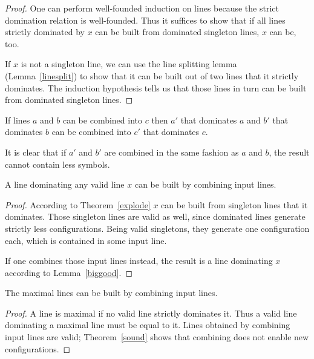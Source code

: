 \documentclass[english, 12pt, a4paper, sci, a-1b, online]{aaltothesis}
\begin{document}
\begin{proof}
One can perform well-founded induction on lines because the strict domination relation is well-founded. Thus it suffices to show that if all lines strictly dominated by $x$ can be built from dominated singleton lines, $x$ can be, too.

If $x$ is not a singleton line, we can use the line splitting lemma (Lemma~\ref{linesplit}) to show that it can be built out of two lines that it strictly dominates. The induction hypothesis tells us that those lines in turn can be built from dominated singleton lines.
\end{proof}

\begin{lemma}\label{biggood}
If lines $a$ and $b$ can be combined into $c$ then $a'$ that dominates $a$ and $b'$ that dominates $b$ can be combined into $c'$ that dominates $c$.
\end{lemma}

It is clear that if $a'$ and $b'$ are combined in the same fashion as $a$ and $b$, the result cannot contain less symbols.

\begin{theorem}\label{complete}
A line dominating any valid line $x$ can be built by combining input lines.
\end{theorem}

\begin{proof}
According to Theorem~\ref{explode} $x$ can be built from singleton lines that it dominates. Those singleton lines are valid as well, since dominated lines generate strictly less configurations. Being valid singletons, they generate one configuration each, which is contained in some input line.

If one combines those input lines instead, the result is a line dominating $x$ according to Lemma~\ref{biggood}.
\end{proof}

\begin{corollary}
The maximal lines can be built by combining input lines.
\end{corollary}

\begin{proof}
A line is maximal if no valid line strictly dominates it. Thus a valid line dominating a maximal line must be equal to it. Lines obtained by combining input lines are valid; Theorem~\ref{sound} shows that combining does not enable new configurations.
\end{proof}
\end{document}
